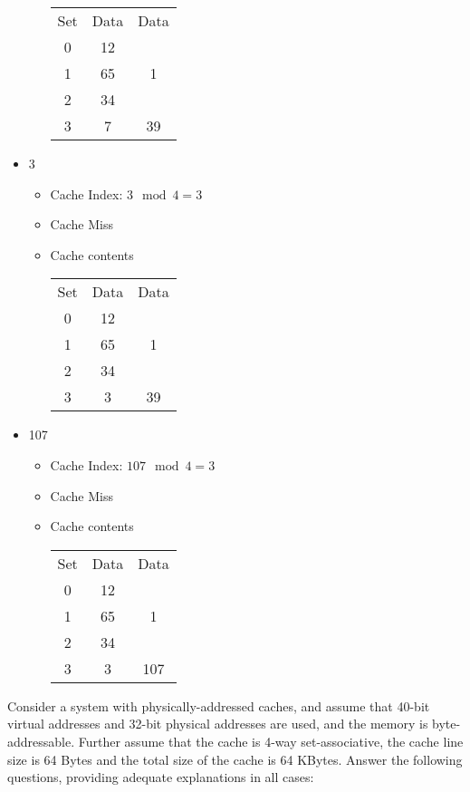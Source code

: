 \documentclass[12pt,letterpaper,twoside]{hmcpset}
\begin{document}
\begin{solution}
\begin{itemize}
\begin{itemize}
  \begin{tabular}{ccc}
    Set & Data & Data\\
    0 & 12 & \\
    1 & 65 & 1\\
    2 & 34 & \\
    3 & 7 & 39
  \end{tabular}
  \end{itemize}
  \item 3
  \begin{itemize}
  \item Cache Index: $3 \mod{4} = 3$
  \item Cache Miss
  \item Cache contents
  
  \begin{tabular}{ccc}
    Set & Data & Data\\
    0 & 12 & \\
    1 & 65 & 1\\
    2 & 34 & \\
    3 & 3 & 39
  \end{tabular}
  \end{itemize}
  \item 107
  \begin{itemize}
  \item Cache Index: $107 \mod{4} = 3$
  \item Cache Miss
  \item Cache contents
  
  \begin{tabular}{ccc}
    Set & Data & Data\\
    0 & 12 & \\
    1 & 65 & 1\\
    2 & 34 & \\
    3 & 3 & 107
  \end{tabular}
  \end{itemize}
 \end{itemize}

\end{solution}

\begin{problem}[2]
 Consider a system with physically-addressed caches, and assume that 40-bit virtual addresses and 32-bit physical addresses are used, and the memory is byte-addressable.  Further assume that the cache is 4-way set-associative, the cache line size is 64 Bytes and the total size of the cache is 64 KBytes.  Answer the following questions, providing adequate explanations in all cases:
\end{problem}
\end{document}

